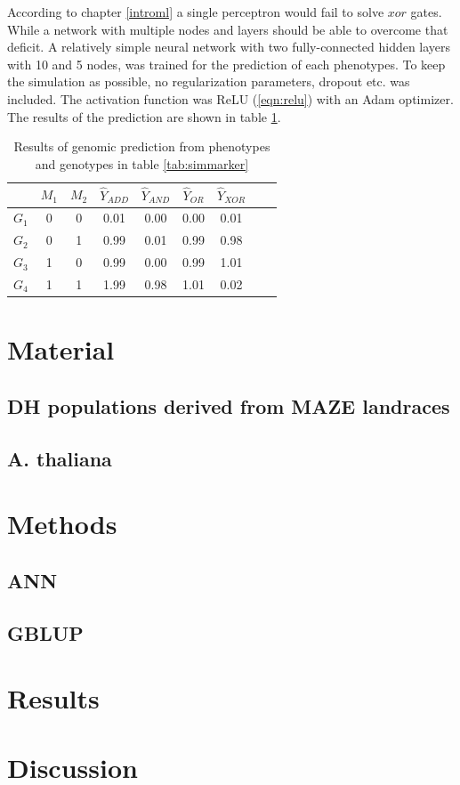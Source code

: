 According to chapter \ref{introml} a single perceptron would fail to solve $xor$ gates. While a network with multiple
nodes and layers should be able to overcome that deficit. A relatively simple neural network with two fully-connected
hidden layers with 10 and 5 nodes, was trained for the prediction of each phenotypes. To keep the simulation as
possible, no regularization parameters, dropout etc. was included. The activation function was ReLU (\ref{eqn:relu})
with an Adam optimizer. The results of the prediction are shown in table \ref{tab:simgpres}.


\begin{table}[H]
\caption{Results of genomic prediction from phenotypes and genotypes in table \ref{tab:simmarker}}
\label{tab:simgpres}
\centering
\begin{tabular}{ l c c | c c c c c c }
  \toprule
  & $M_1$ & $M_2$ & $\hat{Y}_{ADD}$ & $\hat{Y}_{AND}$ & $\hat{Y}_{OR}$ & $\hat{Y}_{XOR}$\\
  \midrule
  \hline 
  $G_1$ & 0 & 0 & 0.01 & 0.00 & 0.00 & 0.01 \\
  $G_2$ & 0 & 1 & 0.99 & 0.01 & 0.99 & 0.98 \\
  $G_3$ & 1 & 0 & 0.99 & 0.00 & 0.99 & 1.01 \\
  $G_4$ & 1 & 1 & 1.99 & 0.98 & 1.01 & 0.02 \\
  \bottomrule
\end{tabular}
\end{table}


\section{Material}
\subsection{DH populations derived from MAZE landraces}
\subsection{A. thaliana}
\section{Methods}
\subsection{ANN}
\subsection{GBLUP}


\section{Results}
\section{Discussion}
